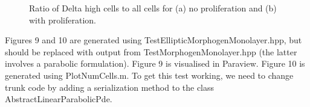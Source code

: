 \documentclass[12pt]{article}
\begin{document}

\begin{figure}
\centering
\setlength{\unitlength}{1cm}
\caption{Ratio of Delta high cells to all cells for (a) no proliferation and  (b) with proliferation.}
\label{fig:DeltaNotchStats:metrics}
\end{figure}


Figures 9 and 10 are generated using TestEllipticMorphogenMonolayer.hpp, but should be replaced with output from TestMorphogenMonolayer.hpp (the latter involves a parabolic formulation).
Figure 9 is visualised in Paraview.
Figure 10 is generated using PlotNumCells.m. 
To get this test working, we need to change trunk code by adding a serialization method to the class AbstractLinearParabolicPde. 
\end{document}
